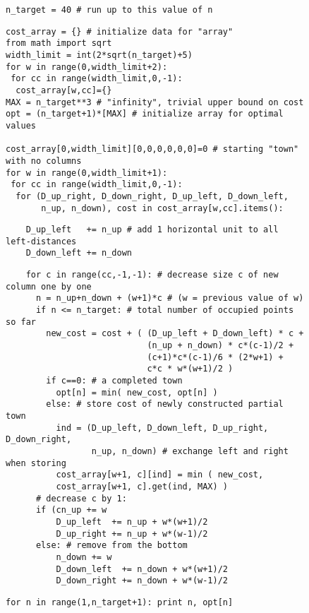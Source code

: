 \documentclass[preprint,authoryear,12pt]{elsarticle}
\begin{document}















\appendix

\begin{figure}
  \centering
{\small
\footnotesize
\begin{verbatim}
n_target = 40 # run up to this value of n
\end{verbatim}
\vspace{-1,6\baselineskip}
\begin{verbatim}
cost_array = {} # initialize data for "array"
from math import sqrt
width_limit = int(2*sqrt(n_target)+5)
for w in range(0,width_limit+2):
 for cc in range(width_limit,0,-1):
  cost_array[w,cc]={}
MAX = n_target**3 # "infinity", trivial upper bound on cost
opt = (n_target+1)*[MAX] # initialize array for optimal values

cost_array[0,width_limit][0,0,0,0,0,0]=0 # starting "town" with no columns
for w in range(0,width_limit+1):
 for cc in range(width_limit,0,-1):
  for (D_up_right, D_down_right, D_up_left, D_down_left,
       n_up, n_down), cost in cost_array[w,cc].items():
\end{verbatim}
\vspace{-1,7\baselineskip}
\begin{verbatim}
    D_up_left   += n_up # add 1 horizontal unit to all left-distances
    D_down_left += n_down
\end{verbatim}
\vspace{-1,7\baselineskip}
\begin{verbatim}
    for c in range(cc,-1,-1): # decrease size c of new column one by one
      n = n_up+n_down + (w+1)*c # (w = previous value of w)
      if n <= n_target: # total number of occupied points so far
        new_cost = cost + ( (D_up_left + D_down_left) * c +
                            (n_up + n_down) * c*(c-1)/2 +
                            (c+1)*c*(c-1)/6 * (2*w+1) +
                            c*c * w*(w+1)/2 )
        if c==0: # a completed town
          opt[n] = min( new_cost, opt[n] )
        else: # store cost of newly constructed partial town
          ind = (D_up_left, D_down_left, D_up_right, D_down_right,
                 n_up, n_down) # exchange left and right when storing
          cost_array[w+1, c][ind] = min ( new_cost,
          cost_array[w+1, c].get(ind, MAX) )
      # decrease c by 1:
      if (cn_up += w
          D_up_left  += n_up + w*(w+1)/2
          D_up_right += n_up + w*(w-1)/2
      else: # remove from the bottom
          n_down += w
          D_down_left  += n_down + w*(w+1)/2
          D_down_right += n_down + w*(w-1)/2
\end{verbatim}
\vspace{-1,6\baselineskip}
\begin{verbatim}
for n in range(1,n_target+1): print n, opt[n]
\end{verbatim}
}


\end{figure}
\end{document}
